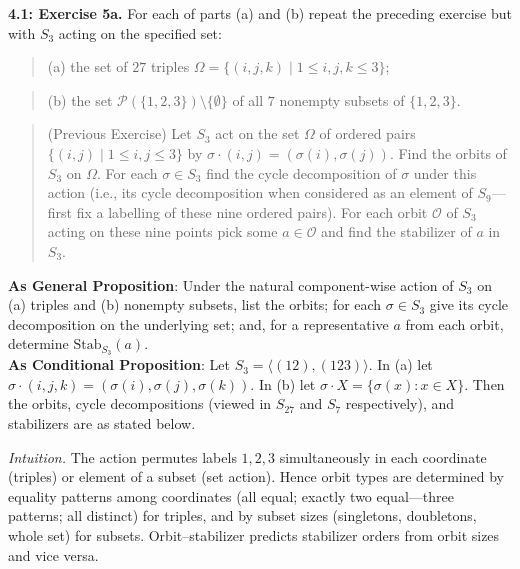 \documentclass[11pt]{article}
\theoremstyle{definition}
\begin{document}
\newpage

\newpage

\noindent \textbf{4.1: Exercise 5a.} For each of parts (a) and (b) repeat the preceding exercise but with $S_3$ acting on the specified set:\\

\begin{quote}
(a) the set of $27$ triples $\Omega=\{(i,j,k)\mid 1\le i,j,k\le 3\}$;
\end{quote}

\begin{quote}
(b) the set $\mathcal P(\{1,2,3\})\setminus\{\emptyset\}$ of all $7$ nonempty subsets of $\{1,2,3\}$.
\end{quote} %

\begin{quote} 

(Previous Exercise) Let $S_3$ act on the set $\Omega$ of ordered pairs $\{(i,j)\mid 1\le i,j\le 3\}$ by $\sigma\!\cdot\!(i,j)=(\sigma(i),\sigma(j))$. Find the orbits of $S_3$ on $\Omega$. For each $\sigma\in S_3$ find the cycle decomposition of $\sigma$ under this action (i.e., its cycle decomposition when considered as an element of $S_9$—first fix a labelling of these nine ordered pairs). For each orbit $\mathcal O$ of $S_3$ acting on these nine points pick some $a\in\mathcal O$ and find the stabilizer of $a$ in $S_3$.\\ %

\end{quote}

\noindent\textbf{As General Proposition}: Under the natural component-wise action of $S_3$ on (a) triples and (b) nonempty subsets, list the orbits; for each $\sigma\in S_3$ give its cycle decomposition on the underlying set; and, for a representative $a$ from each orbit, determine $\mathrm{Stab}_{S_3}(a)$.\\

\noindent\textbf{As Conditional Proposition}: Let $S_3=\langle (12),(123)\rangle$. In (a) let $\sigma\cdot(i,j,k)=(\sigma(i),\sigma(j),\sigma(k))$. In (b) let $\sigma\cdot X=\{\sigma(x):x\in X\}$. Then the orbits, cycle decompositions (viewed in $S_{27}$ and $S_7$ respectively), and stabilizers are as stated below.

\newpage

\dotfill

\emph{Intuition.} The action permutes labels $1,2,3$ simultaneously in each coordinate (triples) or element of a subset (set action). Hence orbit types are determined by equality patterns among coordinates (all equal; exactly two equal—three patterns; all distinct) for triples, and by subset sizes (singletons, doubletons, whole set) for subsets. Orbit–stabilizer predicts stabilizer orders from orbit sizes and vice versa.\\
\end{document}
